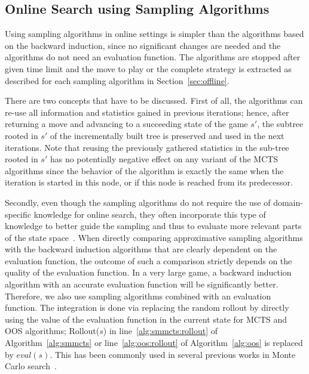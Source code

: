 \subsection{Online Search using Sampling Algorithms}


Using sampling algorithms in online settings is simpler than the algorithms based on the backward induction, since no significant changes are needed and the algorithms do not need an evaluation function.
The algorithms are stopped after given time limit and the move to play or the complete strategy is extracted as described for each sampling algorithm in Section~\ref{sec:offline}.

There are two concepts that have to be discussed.
First of all, the algorithms can re-use all information and statistics gained in previous iterations; hence, after returning a move and advancing to a succeeding state of the game $s'$, the subtree rooted in $s'$ of the incrementally built tree is preserved and used in the next iterations.
Note that reusing the previously gathered statistics in the sub-tree rooted in $s'$ has no potentially negative effect on any variant of the MCTS algorithms since the behavior of the algorithm is exactly the same when the iteration is started in this node, or if this node is reached from its predecessor. 

Secondly, even though the sampling algorithms do not require the use of domain-specific knowledge for online search, they often incorporate this type of knowledge to better guide the sampling and thus to evaluate more relevant parts of the state space~\cite{Gelly07Combining,Lorentz08Amazons,Winands10MCTS-LOA,Lorentz13Breakthrough,Lanctot14Implicit}. When directly comparing approximative sampling algorithms with the backward induction algorithms that are clearly dependent on the evaluation function, the outcome of such a comparison strictly depends on the quality of the evaluation function. In a very large game, a backward induction algorithm with an accurate evaluation function will be significantly better. %
Therefore, we also use sampling algorithms combined with an evaluation function. The integration is done via replacing the random rollout
by directly using the value of the evaluation function in the current state for MCTS and OOS algorithms; \ie Rollout($s$) in
line~\ref{alg:smmcts:rollout} of Algorithm~\ref{alg:smmcts} or line~\ref{alg:oos:rollout} of Algorithm~\ref{alg:oos} is replaced by $eval(s)$.
This has been commonly used in several previous works in Monte Carlo search~\cite{Lorentz08Amazons,Lorentz13Breakthrough,Lanctot14Implicit,RamanujanS11,Lanctot13MCMS}.

